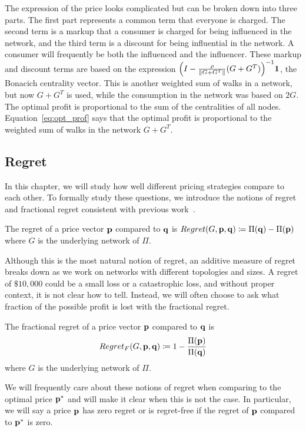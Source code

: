 The expression of the price looks complicated but can be broken down into three parts. The first part represents a common term that everyone is charged. The second term is a markup that a consumer is charged for being influenced in the network, and the third term is a discount for being influential in the network. A consumer will frequently be both the influenced and the influencer. These markup and discount terms are based on the expression ${\left(I - \frac{\rho}{\|G+G^T\|} (G+G^T) \right)}^{-1} \mathbf{1}$, the Bonacich centrality vector. This is another weighted sum of walks in a network, but now $G+G^T$ is used, while the consumption in the network was based on $2G$. The optimal profit is proportional to the sum of the centralities of all nodes. Equation~\ref{eq:opt_prof} says that the optimal profit is proportional to the weighted sum of walks in the network $G+G^T$. 

\subsection{Regret}

In this chapter, we will study how well different pricing strategies compare to each other. To formally study these questions, we introduce the notions of regret and fractional regret consistent with previous work~\cite{huang2022value}. 

\begin{definition}
    The regret of a price vector $\mathbf{p}$ compared to $\mathbf{q}$ is $Regret(G, \mathbf{p}, \mathbf{q}) \coloneqq \Pi(\mathbf{q}) - \Pi(\mathbf{p})$ where $G$ is the underlying network of $\Pi$.
\end{definition}

Although this is the most natural notion of regret, an additive measure of regret breaks down as we work on networks with different topologies and sizes. A regret of  $\$10,000$ could be a small loss or a catastrophic loss, and without proper context, it is not clear how to tell. Instead, we will often choose to ask what fraction of the possible profit is lost with the fractional regret. 

\begin{definition}
    The fractional regret of a price vector $\mathbf{p}$ compared to $\mathbf{q}$ is \[Regret_F(G, \mathbf{p}, \mathbf{q}) \coloneqq 1 - \frac{\Pi(\mathbf{p})}{\Pi(\mathbf{q})}\]
    where $G$ is the underlying network of $\Pi$.
\end{definition}

We will frequently care about these notions of regret when comparing to the optimal price $\mathbf{p}^*$ and will make it clear when this is not the case.  In particular, we will say a price $\mathbf{p}$ has zero regret or is regret-free if the regret of $\mathbf{p}$  compared to $\mathbf{p}^*$ is zero. 


